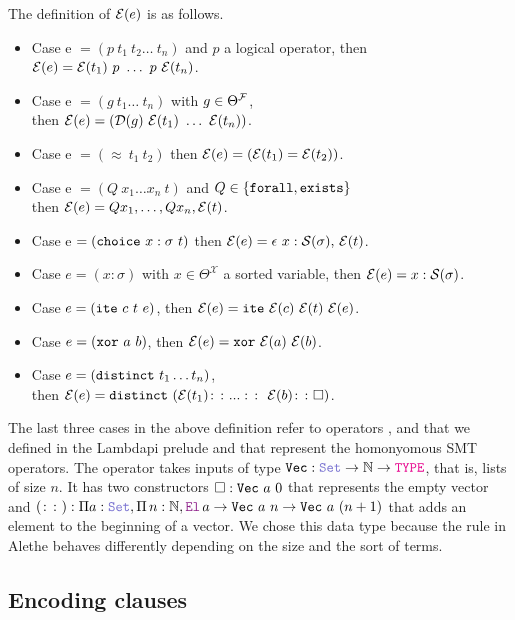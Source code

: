 \begin{definition}
The definition of $\E{e}$ is as follows.
\begin{itemize}
\setlength{\parskip}{0pt}
\item Case e $= (p~t_1~t_2\dots~t_n)$ and $p$ a logical operator, then $\E{e} = \E{t_1}~p~\dots~p~\E{t_n}$.
\item Case e $= (g~t_1\dots~t_n)$ with $g \in \Theta^\cal{F}$,\\
  then $\E{e} = (\mathcal{D}(g)~\E{t_1}~\dots~\E{t_n})$.
\item Case e $= (\approx~t_1~t_2)$ then $\E{e} = (\E{t_1} = \E{t_2})$.
\item Case e $= (Q~x_1  \dots x_n ~t)$ and $Q\in \{\kw{forall}, \kw{exists}\}$\\
  then $\E{e} = Q x_1, \dots, Q x_n, \E{t}$. 
\item Case e $= (\kw{choice}~x : \sigma ~t)$ then $\E{e} = \epsilon~x: \cal{S}(\sigma),\, \E{t}$.
\item Case $e = (x: \sigma )$ with $x \in \Theta^\mathcal{X}$ a sorted variable, then $\E{e} = x: \cal{S}(\sigma)$.
\item Case $e = (\kw{ite}~c~t~e)$, then $\E{e} = \kw{ite}~\E{c}~\E{t}~\E{e}$.
\item Case $e = (\kw{xor}~a~b)$, then $\E{e} = \kw{xor}~\E{a}~\E{b}$.
\item Case $e = (\kw{distinct}~t_1 \dots t_n)$,\\
  then $\E{e} = \kw{distinct}~(\E{t_1} \colon\colon ...\, \colon\colon ~\E{b} \colon\colon \square)$.
\end{itemize}
\end{definition}

The last three cases in the above definition refer to operators ,  and  that we defined in the Lambdapi prelude and that represent the homonyomous SMT operators.
The operator  takes inputs of type $\kw{Vec}: \set \ra \N \ra \type$, that is, lists of size $n$. It has two constructors $\square : \kw{Vec}~a~0$ that represents the empty vector and $(\colon\colon): \Pi a : \set, \Pi\,n : \N, \el\, a \ra \kw{Vec}~a~n \ra \kw{Vec}~a~(n+1)$ that adds an element to the beginning of a vector.
We chose this data type because the  rule in Alethe \cite[(Rule 93)]{alethespec} behaves differently depending on the size and the sort of terms.

\subsection{Encoding clauses}

